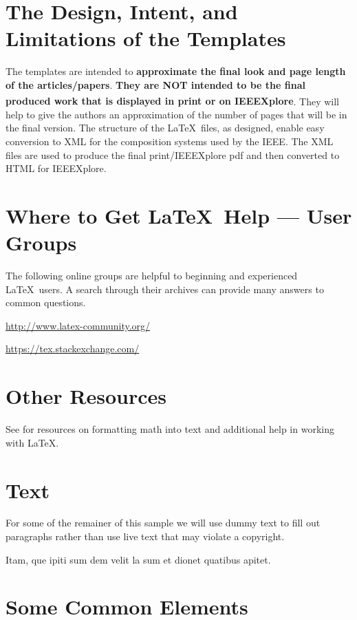 \documentclass[journal,9pt]{IEEEtran}
\begin{document}
\section{The Design, Intent, and \\ Limitations of the Templates}
The templates are intended to {\bf{approximate the final look and page length of the articles/papers}}. {\bf{They are NOT intended to be the final produced work that is displayed in print or on IEEEXplore\textsuperscript{\textregistered}}}. They will help to give the authors an approximation of the number of pages that will be in the final version. The structure of the \LaTeX\ files, as designed, enable easy conversion to XML for the composition systems used by the IEEE. The XML files are used to produce the final print/IEEEXplore pdf and then converted to HTML for IEEEXplore.

\section{Where to Get \LaTeX \ Help --- User Groups}
The following online groups are helpful to beginning and experienced \LaTeX\ users. A search through their archives can provide many answers to common questions.
\begin{list}{}{}
  \item{\url{http://www.latex-community.org/}}
  \item{\url{https://tex.stackexchange.com/} }
\end{list}

\section{Other Resources}
See \cite{ref1,ref2,ref3,ref4,ref5} for resources on formatting math into text and additional help in working with \LaTeX .

\section{Text}
For some of the remainer of this sample we will use dummy text to fill out paragraphs rather than use live text that may violate a copyright.

Itam, que ipiti sum dem velit la sum et dionet quatibus apitet.

\section{Some Common Elements}
\end{document}
